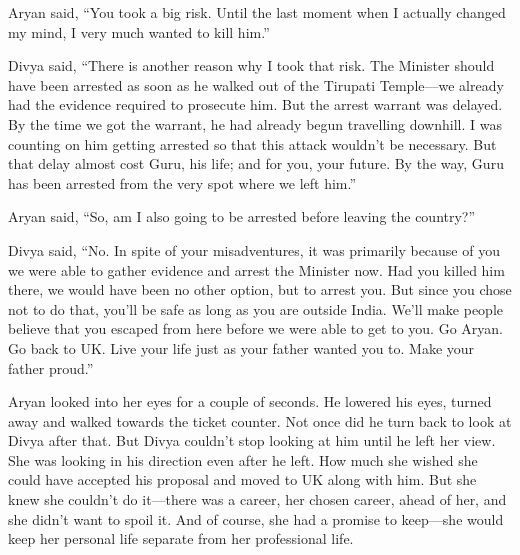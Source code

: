 Aryan said, “You took a big risk. Until the last moment when I actually changed
my mind, I very much wanted to kill him.”

Divya said, “There is another reason why I took that risk. The Minister should
have been arrested as soon as he walked out of the Tirupati Temple—we already
had the evidence required to prosecute him. But the arrest warrant was delayed.
By the time we got the warrant, he had already begun travelling downhill. I was
counting on him getting arrested so that this attack wouldn't be necessary. But
that delay almost cost Guru, his life; and for you, your future. By the way,
Guru has been arrested from the very spot where we left him.”

Aryan said, “So, am I also going to be arrested before leaving the country?”

Divya said, “No. In spite of your misadventures, it was primarily because of you
we were able to gather evidence and arrest the Minister now. Had you killed him
there, we would have been no other option, but to arrest you. But since you
chose not
to do that, you'll be safe as long as you are outside India. We'll make people
believe that you escaped from here before we were able to get to you. Go Aryan.
Go back to UK. Live your life just as your father wanted you to. Make your
father proud.”

Aryan looked into her eyes for a couple of seconds. He lowered his eyes, turned
away and walked towards the ticket counter. Not once did he turn back to look at
Divya after that. But Divya couldn't stop looking at him until he left her view.
She was looking in his direction even after he left. How much she wished she
could have accepted his proposal and moved to UK along with him. But she knew
she couldn't do it—there was a career, her chosen career, ahead of her, and she
didn't want to spoil it. And of course, she had a promise to keep—she would
keep her personal life separate from her professional life.